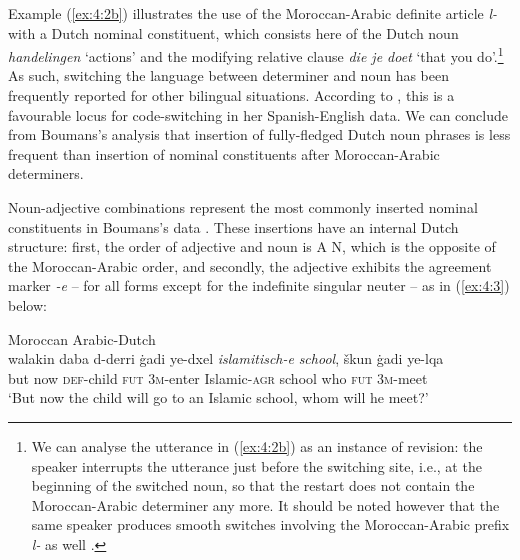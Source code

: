 \noindent Example (\ref{ex:4:2b}) illustrates the use of the Moroccan-Arabic definite article \textit{l-} with a Dutch nominal constituent, which consists here of the Dutch noun \textit{handelingen} `actions' and the modifying relative clause \textit{die je doet} `that you do'.\footnote{We can analyse the utterance in (\ref{ex:4:2b}) as an instance of revision: the speaker interrupts the utterance just before the switching site, i.e., at the beginning of the switched noun, so that the restart does not contain the Moroccan-Arabic determiner any more. It should be noted however that the same speaker produces smooth switches involving the Moroccan-Arabic prefix \textit{l-} as well \citep[cf.][185]{boumans-syntax-1998}.} As such, switching the language between determiner and noun has been frequently reported for other bilingual situations. According to \citet[604]{poplack-sometimes-1980}, this is a favourable locus for code-switching in her Spanish-English data. We can conclude from Boumans's analysis that insertion of fully-fledged Dutch noun phrases is less frequent than insertion of nominal constituents after Moroccan-Arabic determiners.

Noun-adjective combinations represent the most commonly inserted nominal constituents in Boumans's data \citep[cf.][203--205]{boumans-syntax-1998}. These insertions have an internal Dutch structure: first, the order of adjective and noun is A N, which is the opposite of the Moroccan-Arabic order, and secondly, the adjective exhibits the agreement marker \textit{-e} -- for all forms except for the indefinite singular neuter -- as in (\ref{ex:4:3}) below: 

\ea
\label{ex:4:3}
Moroccan Arabic-Dutch \citep[204]{boumans-syntax-1998}\\
\gll walakin daba d-derri ġadi ye-dxel \textit{islamitisch-e} \textit{school}, škun ġadi ye-lqa\\
	but now \textsc{def}-child \textsc{fut} \textsc{3m}-enter Islamic-\textsc{agr} school who \textsc{fut} \textsc{3m}-meet\\
\glt `But now the child will go to an Islamic school, whom will he meet?'
\z

